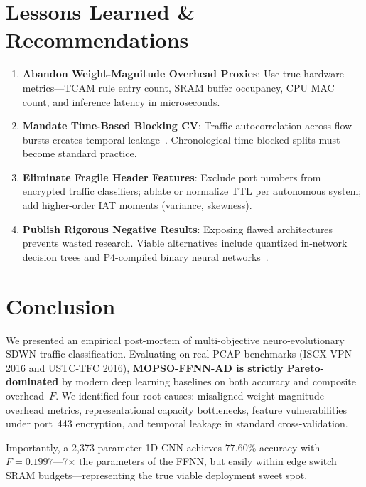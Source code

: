 \documentclass[journal]{IEEEtran}
\begin{document}
\section{Lessons Learned \& Recommendations}
\label{sec:lessons}

\begin{enumerate}
  \item \textbf{Abandon Weight-Magnitude Overhead Proxies}: Use true hardware
    metrics---TCAM rule entry count, SRAM buffer occupancy, CPU MAC count,
    and inference latency in microseconds.
  \item \textbf{Mandate Time-Based Blocking CV}: Traffic autocorrelation
    across flow bursts creates temporal leakage~\cite{arp2022,holland2024}.
    Chronological time-blocked splits must become standard practice.
  \item \textbf{Eliminate Fragile Header Features}: Exclude port numbers from
    encrypted traffic classifiers; ablate or normalize TTL per autonomous
    system; add higher-order IAT moments (variance, skewness).
  \item \textbf{Publish Rigorous Negative Results}: Exposing flawed
    architectures prevents wasted research. Viable alternatives include
    quantized in-network decision trees and P4-compiled binary neural
    networks~\cite{siracusano2022}.
\end{enumerate}

\section{Conclusion}
\label{sec:conclusion}

We presented an empirical post-mortem of multi-objective neuro-evolutionary
SDWN traffic classification. Evaluating on real PCAP benchmarks (ISCX VPN 2016
and USTC-TFC 2016), \textbf{MOPSO-FFNN-AD is strictly Pareto-dominated} by
modern deep learning baselines on both accuracy and composite overhead~$F$.
We identified four root causes: misaligned weight-magnitude overhead metrics,
representational capacity bottlenecks, feature vulnerabilities under port~443
encryption, and temporal leakage in standard cross-validation.

Importantly, a 2,373-parameter 1D-CNN achieves $77.60\%$ accuracy with
$F{=}0.1997$---7$\times$ the parameters of the FFNN, but easily within edge
switch SRAM budgets---representing the true viable deployment sweet spot.
\end{document}
